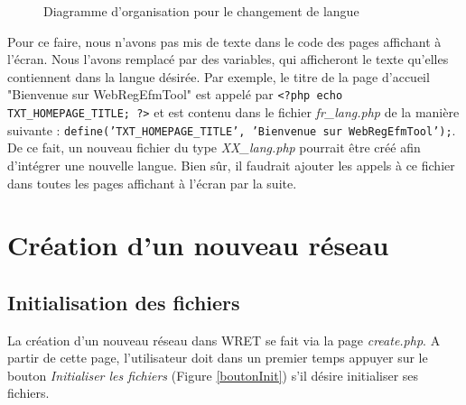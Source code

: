 \begin{figure}[!ht]
	\begin{center}
		\caption{Diagramme d'organisation pour le changement de langue}
  		\label{DiagLangues}
  	\end{center}	
\end{figure}

Pour ce faire, nous n'avons pas mis de texte dans le code des pages affichant à l'écran. Nous l'avons remplacé par des variables, qui afficheront le texte qu'elles contiennent dans la langue désirée. Par exemple, le titre de la page d'accueil "Bienvenue sur WebRegEfmTool" est appelé par \texttt{<?php echo TXT\_HOMEPAGE\_TITLE; ?>} et est contenu dans le fichier \emph{fr\_lang.php} de la manière suivante :
\texttt{define('TXT\_HOMEPAGE\_TITLE', 'Bienvenue sur WebRegEfmTool');}. De ce fait, un nouveau fichier du type \emph{XX\_lang.php} pourrait être créé afin d'intégrer une nouvelle langue. Bien sûr, il faudrait ajouter les appels à ce fichier dans toutes les pages affichant à l'écran par la suite. 

\section{Création d'un nouveau réseau}

\subsection{Initialisation des fichiers}
La création d'un nouveau réseau dans WRET se fait via la page \emph{create.php}.
A partir de cette page, l'utilisateur doit dans un premier temps appuyer sur le bouton \emph{Initialiser les fichiers} (Figure \ref{boutonInit}) s'il désire initialiser ses fichiers.


